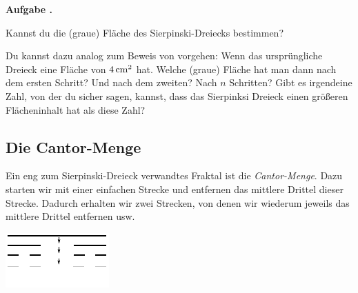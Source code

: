 \documentclass[a4paper,ngerman,12pt]{scrartcl}
\theoremstyle{definition}
\theoremstyle{plain}
\theoremstyle{remark}
\newlength{\aufgabenskip}
\newcounter{aufgabennummer}
\newenvironment{aufgabe}[1]{
  \addtocounter{aufgabennummer}{1}
  \textbf{Aufgabe \theaufgabennummer.} \emph{#1} \par
}{\vspace{\aufgabenskip}}
\begin{document}
\begin{aufgabe}{}
	Kannst du die (graue) Fläche des Sierpinski-Dreiecks bestimmen? 
	
	Du kannst dazu analog zum Beweis von  vorgehen: Wenn das ursprüngliche Dreieck eine Fläche von $\unit[4]{cm^2}$ hat. Welche (graue) Fläche hat man dann nach dem ersten Schritt? Und nach dem zweiten? Nach $n$ Schritten? Gibt es irgendeine Zahl, von der du sicher sagen, kannst, dass das Sierpinksi Dreieck einen größeren Flächeninhalt hat als diese Zahl?
\end{aufgabe}


%	
%	
%


\subsection{Die Cantor-Menge}\label{aufgabe:Cantor-Menge}

Ein eng zum Sierpinski-Dreieck verwandtes Fraktal ist die \emph{Cantor-Menge}. Dazu starten wir mit einer einfachen Strecke und entfernen das mittlere Drittel dieser Strecke. Dadurch erhalten wir zwei Strecken, von denen wir wiederum jeweils das mittlere Drittel entfernen usw.

\begin{center}
	\includegraphics[width=.5\textwidth]{Bilder/Cantor_Menge.pdf}
\end{center}
\end{document}
